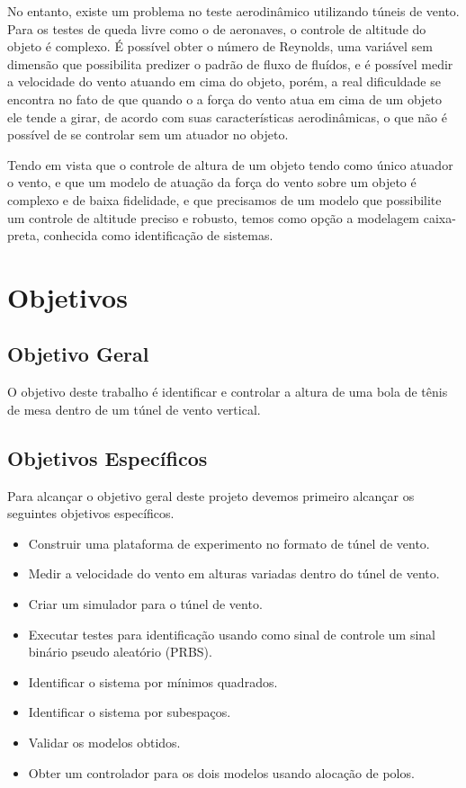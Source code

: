 No entanto, existe um problema no teste aerodinâmico utilizando túneis de vento. Para os testes de queda livre como o de aeronaves, o controle de altitude do objeto é complexo. É possível obter o número de Reynolds, uma variável sem dimensão que possibilita predizer o padrão de fluxo de fluídos, e é possível medir a velocidade do vento atuando em cima do objeto, porém, a real dificuldade se encontra no fato de que quando o a força do vento atua em cima de um objeto ele tende a girar, \cite{briggs1959} de acordo com suas características aerodinâmicas, o que não é possível de se controlar sem um atuador no objeto.


Tendo em vista que o controle de altura de um objeto tendo como único atuador o vento, e que um modelo de atuação da força do vento sobre um objeto é complexo e de baixa fidelidade, e que precisamos de um modelo que possibilite um controle de altitude preciso e robusto, temos como opção a modelagem caixa-preta, conhecida como identificação de sistemas.


\section{Objetivos}

\subsection{Objetivo Geral}

O objetivo deste trabalho é identificar e controlar a altura de uma bola de tênis de mesa dentro de um túnel de vento vertical.

\subsection{Objetivos Específicos}

Para alcançar o objetivo geral deste projeto devemos primeiro alcançar os seguintes objetivos específicos.

\begin{itemize}
	\item Construir uma plataforma de experimento no formato de túnel de vento.
	\item Medir a velocidade do vento em alturas variadas dentro do túnel de vento.
	\item Criar um simulador para o túnel de vento.
	\item Executar testes para identificação usando como sinal de controle um sinal binário pseudo aleatório (PRBS).
	\item Identificar o sistema por mínimos quadrados.
	\item Identificar o sistema por subespaços.
	\item Validar os modelos obtidos.
	\item Obter um controlador para os dois modelos usando alocação de polos.
\end{itemize}

